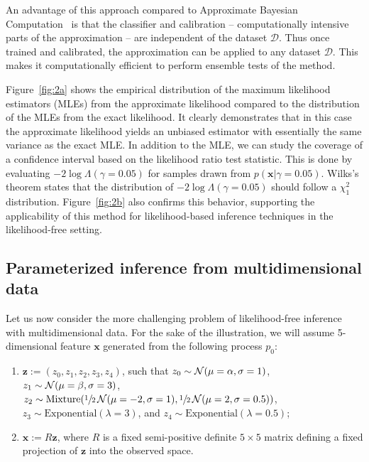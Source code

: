 \documentclass[12pt]{article}
\numberwithin{equation}{section}
\theoremstyle{plain}
\begin{document}
An advantage of this approach compared to Approximate Bayesian Computation~\citep{beaumont2002approximate} is that the
classifier and calibration -- computationally intensive
parts of the approximation  -- are independent of the dataset $\mathcal{D}$.
Thus once trained and calibrated, the approximation can be applied to any dataset $\mathcal{D}$.
This makes it computationally efficient to perform ensemble tests of the method.

Figure~\ref{fig:2a} shows the empirical distribution of the maximum likelihood estimators (MLEs) from the
approximate likelihood compared to the distribution of the MLEs from the exact likelihood.
It clearly demonstrates that in this case the approximate likelihood yields an unbiased estimator with essentially the same variance as the exact MLE.
In addition to the MLE, we can study the coverage of a confidence interval based on the likelihood ratio test statistic.
This is done by evaluating $-2\log \Lambda(\gamma=0.05)$ for samples drawn from $p(\mathbf{x} | \gamma=0.05)$.
Wilks's theorem states that the distribution of $-2\log \Lambda(\gamma=0.05)$ should follow a $\chi^2_1$ distribution.
%
Figure~\ref{fig:2b} also confirms this behavior, supporting the applicability of this method for likelihood-based inference techniques in the likelihood-free setting.




\subsection{Parameterized inference from multidimensional data}

Let us now consider the more challenging problem of likelihood-free
inference with multidimensional data.
For the sake of the illustration, we will assume 5-dimensional feature $\mathbf{x}$ generated
from the following process $p_0$:
    \begin{enumerate}
        \item $\mathbf{z} := (z_0, z_1, z_2, z_3, z_4)$, such that
            $z_0 \sim {\cal N}(\mu=\alpha, \sigma=1)$,
            $z_1 \sim {\cal N}(\mu=\beta, \sigma=3)$,
            $z_2 \sim {\text{Mixture}}(\sfrac{1}{2}\,{\cal N}(\mu=-2, \sigma=1), \sfrac{1}{2}\,{\cal N}(\mu=2, \sigma=0.5))$,
            $z_3 \sim {\text{Exponential}(\lambda=3)}$, and
            $z_4 \sim {\text{Exponential}(\lambda=0.5)}$;
        \item $\mathbf{x} := R  \mathbf{z}$, where $R$ is a fixed
        semi-positive definite $5 \times 5$ matrix defining a fixed projection
        of $\mathbf{z}$ into the observed space.
    \end{enumerate}
\end{document}
